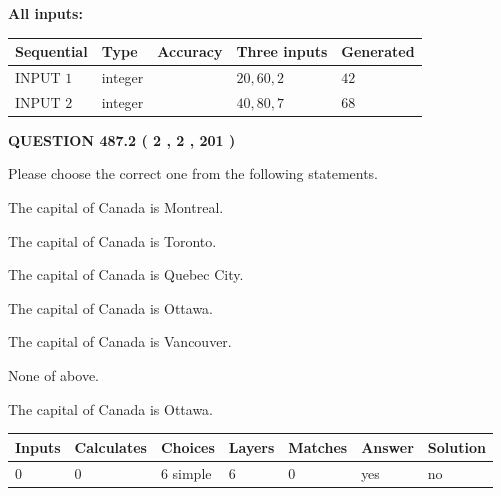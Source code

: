 \documentclass[12pt]{article}
\begin{document}
   
   
   
\noindent\vspace{0.1in}\hspace{-0.08in} {\textbf{\Large{All inputs: }}}
   
   
  
  
\noindent\begin{tabular}{|l|l|l|l|l|}
\hline
 Sequential & Type & Accuracy & Three inputs & Generated \\ 
\hline
 
 
  INPUT $  1 $ & integer &  & $
 20
 , 
 60
 , 
 2
 $ & $ 42 $ 
 \\  \hline  
 
 
  INPUT $  2 $ & integer &  & $
 40
 , 
 80
 , 
 7
 $ & $ 68 $ 
 \\  \hline  
 \end{tabular}
   
   
  
\vspace{0.2in}
  
{\textbf{\Large{QUESTION
487.2 
 ( 2 , 2 , 201 )
}}}
  
  
Please choose the correct one from the following statements.
 
 
The capital of Canada is Montreal.
 
 
The capital of Canada is Toronto.
 
 
The capital of Canada is Quebec City.
 
 
The capital of Canada is Ottawa.
 
 
The capital of Canada is Vancouver.
 
 
 None of above.
 
 
\noindent{}
 
 
The capital of Canada is Ottawa.
 
 
\noindent{}
 
 
   
   
   
   
\noindent\begin{tabular}{|l|l|l|l|l|l|l|}
 \hline
Inputs & Calculates & Choices & Layers & Matches & Answer & Solution \\ \hline
 0  & 
 0  & 
 6
  simple  
  & 
 6  & 
 0  & 
  yes & 
  no 
  \\ \hline
 \end{tabular}
   
\end{document}
